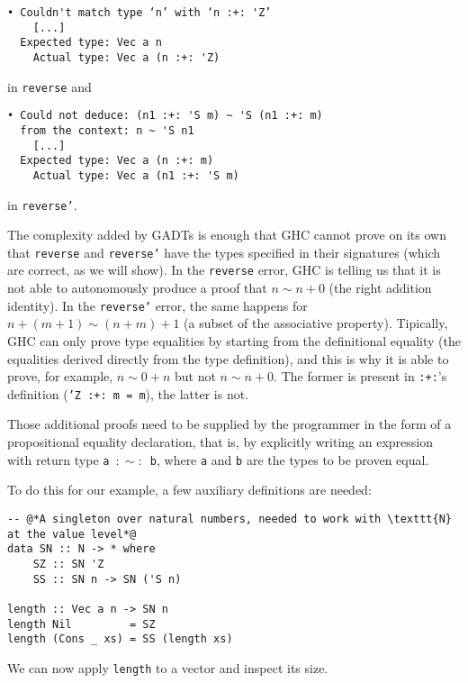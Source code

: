 \begin{verbatim}
• Couldn't match type ‘n’ with ‘n :+: 'Z’
    [...]
  Expected type: Vec a n
    Actual type: Vec a (n :+: 'Z)
\end{verbatim}

in \texttt{reverse} and

\begin{verbatim}
• Could not deduce: (n1 :+: 'S m) ~ 'S (n1 :+: m)
  from the context: n ~ 'S n1
    [...]
  Expected type: Vec a (n :+: m)
    Actual type: Vec a (n1 :+: 'S m)
\end{verbatim}

in \texttt{reverse'}.

The complexity added by GADTs is enough that GHC cannot prove on its own that \texttt{reverse} and \texttt{reverse'} have the types specified in their signatures (which are correct, as we will show).
In the \texttt{reverse} error, GHC is telling us that it is not able to autonomously produce a proof that $n \sim n+0$ (the right addition identity).
In the \texttt{reverse'} error, the same happens for $n+(m+1) \sim (n+m)+1$ (a subset of the associative property).
Tipically, GHC can only prove type equalities by starting from the definitional equality (the equalities derived directly from the type definition), and this is why it is able to prove, for example, $n \sim 0+n$ but not $n \sim n+0$. The former is present in \texttt{:+:}'s definition (\texttt{'Z :+: m = m}), the latter is not.

Those additional proofs need to be supplied by the programmer in the form of a propositional equality declaration, that is, by explicitly writing an expression with return type \texttt{a $:\sim:$ b}, where \texttt{a} and \texttt{b} are the types to be proven equal.

To do this for our example, a few auxiliary definitions are needed:

\begin{lstlisting}[caption=Bringing \texttt{N} to the value level]
-- @*A singleton over natural numbers, needed to work with \texttt{N} at the value level*@
data SN :: N -> * where
    SZ :: SN 'Z
    SS :: SN n -> SN ('S n)

length :: Vec a n -> SN n
length Nil         = SZ
length (Cons _ xs) = SS (length xs)
\end{lstlisting}

We can now apply \texttt{length} to a vector and inspect its size.

